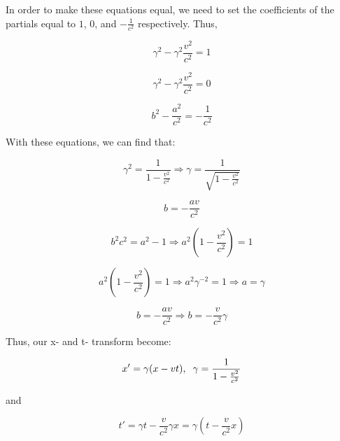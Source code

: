 \documentclass{article}
\begin{document}
In order to make these equations equal, we need to set the coefficients of the partials equal to $1$, $0$, and $-\frac{1}{c^2}$ respectively.  Thus,

\begin{equation}
\gamma^2 - \gamma^2 \frac{v^2}{c^2} = 1
\end{equation}

\begin{equation}
\gamma^2 - \gamma^2 \frac{v^2}{c^2} = 0
\end{equation}

\begin{equation}
b^2 - \frac{a^2}{c^2} = -\frac{1}{c^2}
\end{equation}

With these equations, we can find that:

\begin{equation}
\gamma^2 = \frac{1}{1 - \frac{v^2}{c^2}} \Rightarrow \gamma = \frac{1}{\sqrt{1 - \frac{v^2}{c^2}}}
\end{equation}

\begin{equation}
b = -\frac{av}{c^2}
\end{equation}

\begin{equation}
b^2c^2 = a^2 - 1 \Rightarrow a^2 \left(1 - \frac{v^2}{c^2}\right) = 1
\end{equation}

\begin{equation}
a^2\left(1 - \frac{v^2}{c^2}\right) = 1 \Rightarrow a^2\gamma^{-2} = 1 \Rightarrow a = \gamma
\end{equation}

\begin{equation}
b = -\frac{av}{c^2} \Rightarrow b = -\frac{v}{c^2}\gamma
\end{equation}

Thus, our x- and t- transform become:

\[
x' = \gamma(x - vt), \hspace{2mm} \gamma = \frac{1}{1 - \frac{v^2}{c^2}}
\]

and

\[
t' = \gamma t - \frac{v}{c^2}\gamma x = \gamma \left( t - \frac{v}{c^2}x \right)
\]
\end{document}
